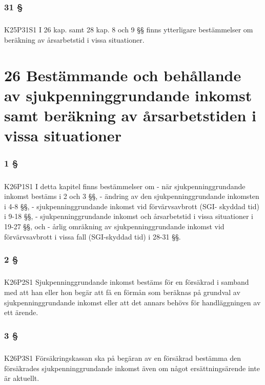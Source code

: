 \documentclass[a4paper,notitlepage,openany,10pt]{book}
\begin{document}
\subsection*{31 §}
\paragraph*{}
{\tiny K25P31S1}
I 26 kap. samt 28 kap. 8 och 9 §§ finns ytterligare bestämmelser om beräkning av årsarbetstid i vissa situationer.
\chapter*{26 Bestämmande och behållande av sjukpenninggrundande inkomst samt beräkning av årsarbetstiden i vissa situationer}
\subsection*{1 §}
\paragraph*{}
{\tiny K26P1S1}
I detta kapitel finns bestämmelser om
\newline - när sjukpenninggrundande inkomst bestäms i 2 och 3 §§,
\newline - ändring av den sjukpenninggrundande inkomsten i 4-8 §§,
\newline - sjukpenninggrundande inkomst vid förvärvsavbrott (SGI- skyddad tid) i 9-18 §§,
\newline - sjukpenninggrundande inkomst och årsarbetstid i vissa situationer i 19-27 §§, och
\newline - årlig omräkning av sjukpenninggrundande inkomst vid förvärvsavbrott i vissa fall (SGI-skyddad tid) i 28-31 §§.
\subsection*{2 §}
\paragraph*{}
{\tiny K26P2S1}
Sjukpenninggrundande inkomst bestäms för en försäkrad i samband med att han eller hon begär att få en förmån som beräknas på grundval av sjukpenninggrundande inkomst eller att det annars behövs för handläggningen av ett ärende.
\subsection*{3 §}
\paragraph*{}
{\tiny K26P3S1}
Försäkringskassan ska på begäran av en försäkrad bestämma den försäkrades sjukpenninggrundande inkomst även om något ersättningsärende inte är aktuellt.
\end{document}
